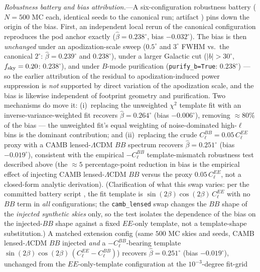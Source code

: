 \documentclass[aps,prd,twocolumn,superscriptaddress,showpacs,preprintnumbers,nofootinbib,longbibliography,floatfix]{revtex4-2}
\begin{document}
\emph{Robustness battery and bias attribution.}---A six-configuration
robustness battery ($N\!=\!500$ MC each, identical seeds to the canonical
run; artifact
)
pins down the origin of the bias. First, an independent local rerun of the
canonical configuration reproduces the pod anchor exactly
($\hat\beta = 0.238^\circ$, bias $-0.032^\circ$). The bias is then
\emph{unchanged} under an apodization-scale sweep ($0.5^\circ$ and
$3^\circ$ FWHM vs.\ the canonical $2^\circ$: $\hat\beta = 0.239^\circ$ and
$0.238^\circ$), under a larger Galactic cut ($|b|>30^\circ$,
$f_{\rm sky}=0.20$: $0.238^\circ$), and under $B$-mode purification
(\texttt{purify\_b=True}: $0.238^\circ$) --- so the earlier attribution of
the residual to apodization-induced power suppression is \emph{not}
supported by direct variation of the apodization scale, and the bias is
likewise independent of footprint geometry and purification. Two
mechanisms do move it: (i)~replacing the unweighted $\chi^2$ template fit
with an inverse-variance-weighted fit recovers $\hat\beta = 0.264^\circ$
(bias $-0.006^\circ$), removing ${\approx}80\%$ of the bias --- the
unweighted fit's equal weighting of noise-dominated high-$\ell$ bins is
the dominant contribution; and (ii)~replacing the crude
$C_\ell^{BB} = 0.05\,C_\ell^{EE}$ proxy with a CAMB lensed-$\Lambda$CDM
$BB$ spectrum recovers $\hat\beta = 0.251^\circ$ (bias $-0.019^\circ$),
consistent with the empirical $-C_\ell^{BB}$ template-mismatch robustness
test described above (the ${\approx}5$ percentage-point reduction in
bias is the empirical effect of injecting CAMB lensed-$\Lambda$CDM $BB$
versus the proxy $0.05\,C_\ell^{EE}$, not a closed-form analytic
derivation). (Clarification of
what this swap varies: per the committed battery script
,
the fit template is $\sin(2\beta)\cos(2\beta)\,C_\ell^{EE}$ with no $BB$
term in \emph{all} configurations; the \texttt{camb\_lensed} swap changes
the $BB$ shape of the \emph{injected synthetic skies} only, so the test
isolates the dependence of the bias on the injected-$BB$ shape against a
fixed $EE$-only template, not a template-shape substitution.) A matched
extension config (same $500$ MC skies and seeds, CAMB lensed-$\Lambda$CDM
$BB$ injected \emph{and} a $-C_\ell^{BB}$-bearing template
$\sin(2\beta)\cos(2\beta)\,(C_\ell^{EE}-C_\ell^{BB})$) recovers
$\hat\beta = 0.251^\circ$ (bias $-0.019^\circ$), unchanged from the
$EE$-only-template configuration at the $10^{-3}$-degree fit-grid
\end{document}
